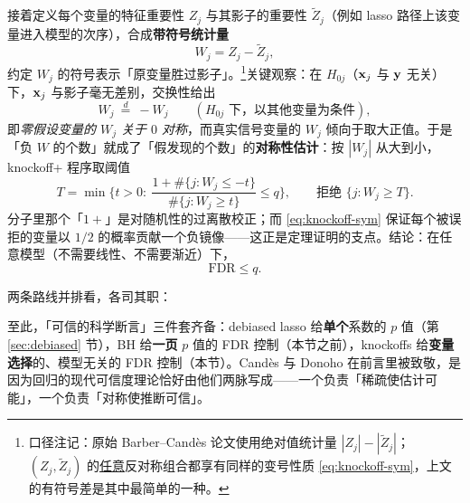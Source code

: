接着定义每个变量的特征重要性 $Z_j$ 与其影子的重要性 $\tilde{Z}_j$（例如 lasso 路径上该变量进入模型的次序），合成\textbf{带符号统计量}
\[
  W_j = Z_j - \tilde{Z}_j ,
\]
约定 $W_j$ 的符号表示「原变量胜过影子」。\footnote{口径注记：原始 Barber--Candès 论文使用绝对值统计量 $|Z_j| - |\tilde{Z}_j|$；$(Z_j, \tilde{Z}_j)$ 的\underline{任意}反对称组合都享有同样的变号性质 \eqref{eq:knockoff-sym}，上文的有符号差是其中最简单的一种。}关键观察：在 $H_{0j}$（$\mathbf{x}_j$ 与 $\mathbf{y}$ 无关）下，$\mathbf{x}_j$ 与影子毫无差别，交换性给出
\begin{equation}\label{eq:knockoff-sym}
  W_j \ \overset{d}{=}\ -W_j
  \qquad (H_{0j} \text{ 下，以其他变量为条件}),
\end{equation}
即\emph{零假设变量的 $W_j$ 关于 $0$ 对称}，而真实信号变量的 $W_j$ 倾向于取大正值。于是「负 $W$ 的个数」就成了「假发现的个数」的\textbf{对称性估计}：按 $|W_j|$ 从大到小， knockoff+ 程序取阈值
\begin{equation}\label{eq:knockoff}
  T = \min\Big\{ t > 0 :\ \frac{ 1 + \#\{ j : W_j \le -t \} }{ \#\{ j : W_j \ge t \} } \le q \Big\},
  \qquad
  \text{拒绝 } \{ j : W_j \ge T \}.
\end{equation}
分子里那个「$1+$」是对随机性的过离散校正；而 \eqref{eq:knockoff-sym} 保证每个被误拒的变量以 $1/2$ 的概率贡献一个负镜像——这正是定理证明的支点。结论：在任意模型（不需要线性、不需要渐近）下，
\[
  \mathrm{FDR} \le q .
\]

两条路线并排看，各司其职：
\begin{center}
\end{center}

至此，「可信的科学断言」三件套齐备：debiased lasso 给\textbf{单个}系数的 $p$ 值（第 \ref{sec:debiased} 节），BH 给\textbf{一页} $p$ 值的 FDR 控制（本节之前），knockoffs 给\textbf{变量选择}的、模型无关的 FDR 控制（本节）。Candès 与 Donoho 在前言里被致敬，是因为回归的现代可信度理论恰好由他们两脉写成——一个负责「稀疏使估计可能」，一个负责「对称使推断可信」。

